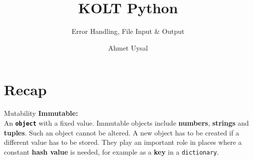 
\usepackage{../KU-Beamer-Template/style/koc} 
\usepackage{minted}
\usepackage{upquote}
\usepackage{graphicx}
\usepackage{tikz}
\usetikzlibrary{shapes.symbols,positioning, chains}

\title{KOLT Python}
\subtitle{Error Handling, File Input \& Output} 
\date{}
\author{Ahmet Uysal}




    \maketitle


    \section{Recap}

    \begin{frame}{Mutability}
        \huge
        \textbf{Immutable:}\\
        \LARGE
        An \texttt{\textbf{object}} with a fixed value.
         Immutable objects include \textbf{numbers}, \textbf{strings} and \textbf{tuples}. Such an object cannot be altered.
         A new object has to be created if a different value has to be stored.
         They play an important role in places where a constant \textbf{hash value} is needed, for example as a \textbf{key} in a \texttt{dictionary}.
        \inputminted[frame=single,framesep=2pt]{python3}{../Lecture6/code-examples/value_update.py}
    \end{frame}

